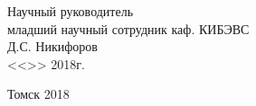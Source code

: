 \begin{titlepage}
\vfill

\begin{flushright}
\begin{minipage}{0.45\textwidth}
 \begin{flushleft}
Научный руководитель\\
младший научный сотрудник каф. КИБЭВС\\
\underline{\hspace{3cm}} Д.С. Никифоров\\
<<\underline{\hspace{1cm}}>>\underline{\hspace{3cm}} 2018г.\\
 \end{flushleft}
\end{minipage}
\end{flushright}

\vfill

\centerline{Томск 2018}
\end{titlepage}
\clearpage
